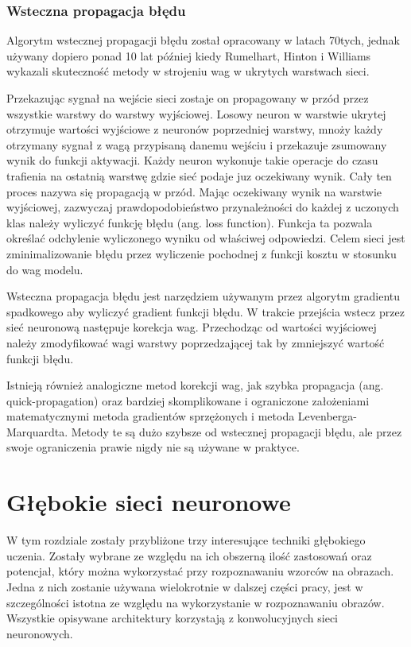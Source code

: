 \documentclass[12pt,a4paper,twoside,titlepage,openright]{book}
\begin{document}
\subsection{Wsteczna propagacja błędu}
Algorytm wstecznej propagacji błędu został opracowany w latach 70tych, jednak używany dopiero ponad 10 lat później kiedy Rumelhart, Hinton i Williams wykazali skuteczność metody w strojeniu wag w ukrytych warstwach sieci.

Przekazując sygnał na wejście sieci zostaje on propagowany w przód przez wszystkie warstwy do warstwy wyjściowej. Losowy neuron w warstwie ukrytej otrzymuje wartości wyjściowe z neuronów poprzedniej warstwy, mnoży każdy otrzymany sygnał z wagą przypisaną danemu wejściu i przekazuje zsumowany wynik do funkcji aktywacji. Każdy neuron wykonuje takie operacje do czasu trafienia na ostatnią warstwę gdzie sieć podaje juz oczekiwany wynik. Cały ten proces nazywa się propagacją w przód. Mając oczekiwany wynik na warstwie wyjściowej, zazwyczaj prawdopodobieństwo przynależności do każdej z uczonych klas należy wyliczyć funkcję błędu (ang. loss function). Funkcja ta pozwala określać odchylenie wyliczonego wyniku od właściwej odpowiedzi. Celem sieci jest zminimalizowanie błędu przez wyliczenie pochodnej z funkcji kosztu w stosunku do wag modelu.

Wsteczna propagacja błędu jest narzędziem używanym przez algorytm gradientu spadkowego aby wyliczyć gradient funkcji błędu. W trakcie przejścia wstecz przez sieć neuronową następuje korekcja wag. Przechodząc od wartości wyjściowej należy zmodyfikować wagi warstwy poprzedzającej tak by zmniejszyć wartość funkcji błędu.

Istnieją również analogiczne metod korekcji wag, jak szybka propagacja (ang. quick-propagation) oraz bardziej skomplikowane i ograniczone założeniami matematycznymi metoda gradientów sprzężonych i metoda Levenberga-Marquardta. Metody te są dużo szybsze od wstecznej propagacji błędu, ale przez swoje ograniczenia prawie nigdy nie są używane w praktyce. \cite{odkrywanieSieci}



\chapter{Głębokie sieci neuronowe}
W tym rozdziale zostały przybliżone trzy interesujące techniki głębokiego uczenia. Zostały wybrane ze względu na ich obszerną ilość zastosowań oraz potencjał, który można wykorzystać przy rozpoznawaniu wzorców na obrazach. Jedna z nich zostanie używana wielokrotnie w dalszej części pracy, jest w szczególności istotna ze względu na wykorzystanie w rozpoznawaniu obrazów. Wszystkie opisywane architektury korzystają z konwolucyjnych sieci neuronowych.
\end{document}
